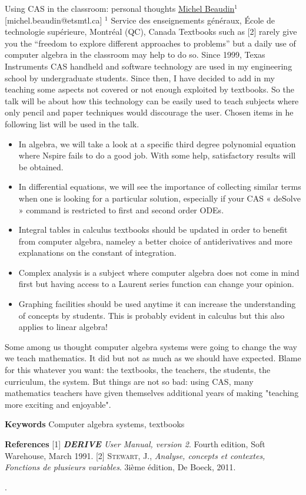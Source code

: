 \begin{abstract_online}{Using CAS in the classroom: personal thoughts}{%
        \underline{Michel Beaudin}$^{1}$}{[michel.beaudin@etsmtl.ca]
        }{%
        $^1$ Service des enseignements généraux, École de technologie supérieure, Montréal (QC), Canada \newline}
Textbooks such as [2] rarely give you the “freedom to explore different approaches to problems” but a daily use of computer algebra in the classroom may help to do so.  Since 1999, Texas Instruments CAS handheld and software technology are used in my engineering school by undergraduate students. Since then, I have decided to add in my teaching some aspects not covered or not enough exploited by textbooks.  So the talk will be about how this technology can be easily used to teach subjects where only pencil and paper techniques would discourage the user.  Chosen items in he following list will be used in the talk.
\begin{itemize}
 \item In algebra, we will take a look at a specific third degree polynomial equation where Nspire fails to do a good job.  With some help, satisfactory results will be obtained.
 \item In differential equations, we will see the importance of collecting similar terms when one is looking for a particular solution, especially if your CAS « deSolve » command is restricted to first and second order ODEs.
 \item Integral tables in calculus textbooks should be updated in order to benefit from computer algebra, nameley a better choice of antiderivatives and more explanations on the constant of integration. 
 \item Complex analysis  is a subject where computer algebra does not come in mind first but having access to a Laurent series function can change your opinion.
 \item Graphing facilities should be used anytime it can increase the understanding of concepts by students.  This is probably evident in calculus but this also applies to linear algebra!
\end{itemize}

Some among us thought computer algebra systems were going to change the way we teach mathematics.  It did but not as much as we should have expected. Blame for this whatever you want: the textbooks, the teachers, the students, the curriculum, the system.  But things are not so bad:  using CAS, many mathematics teachers have given themselves additional years of making "teaching more exciting and enjoyable".  



\textbf{Keywords} \newline{} Computer algebra systems, textbooks

\textbf{References} \newline{}
[1] \emph{\textbf{DERIVE} User Manual, version 2}. Fourth edition, Soft Warehouse, March 1991. \newline{}
[2] \textsc{Stewart, J.}, \emph{Analyse, concepts et contextes, Fonctions de plusieurs variables}. 3ième édition, De Boeck, 2011. \newline{}
\end{abstract_online}
.
    